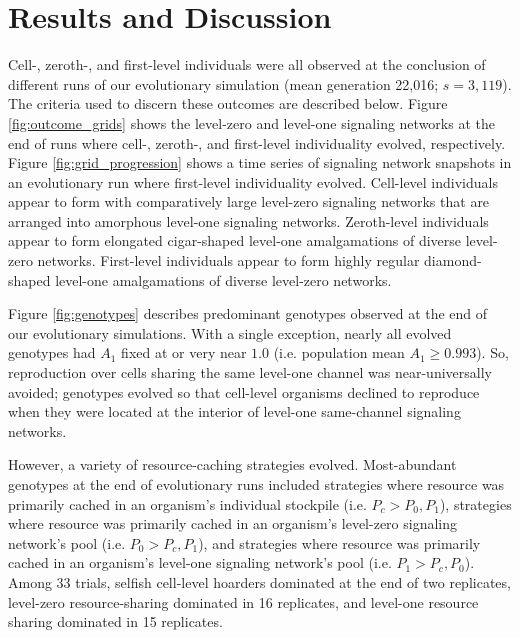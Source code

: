\section{Results and Discussion}













Cell-, zeroth-, and first-level individuals were all observed at the conclusion of different runs of our evolutionary simulation (mean generation 22,016; $s=3,119$).
The criteria used to discern these outcomes are described below.
Figure \ref{fig:outcome_grids} shows the level-zero and level-one signaling networks at the end of runs where cell-, zeroth-, and first-level individuality evolved, respectively.
Figure \ref{fig:grid_progression} shows a time series of signaling network snapshots in an evolutionary run where first-level individuality evolved.
Cell-level individuals appear to form with comparatively large level-zero signaling networks that are arranged into amorphous level-one signaling networks.
Zeroth-level individuals appear to form elongated cigar-shaped level-one amalgamations of diverse level-zero networks.
First-level individuals appear to form highly regular diamond-shaped level-one amalgamations of diverse level-zero networks.

Figure \ref{fig:genotypes} describes predominant genotypes observed at the end of our evolutionary simulations.
With a single exception, nearly all evolved genotypes had $A_1$ fixed at or very near $1.0$ (i.e. population mean $A_1 \geq 0.993$).
So, reproduction over cells sharing the same level-one channel was near-universally avoided;
genotypes evolved so that cell-level organisms declined to reproduce when they were located at the interior of level-one same-channel signaling networks.

However, a variety of resource-caching strategies evolved.
Most-abundant genotypes at the end of evolutionary runs included strategies where resource was primarily cached in an organism's individual stockpile (i.e. $P_{c} > P_0, P_1$), strategies where resource was primarily cached in an organism's level-zero signaling network's pool (i.e. $P_0 > P_{c}, P_1$), and strategies where resource was primarily cached in an organism's level-one signaling network's pool (i.e. $P_1 > P_{c}, P_0$).
Among 33 trials, selfish cell-level hoarders dominated at the end of two replicates, level-zero resource-sharing dominated in 16 replicates, and level-one resource sharing dominated in 15 replicates.

